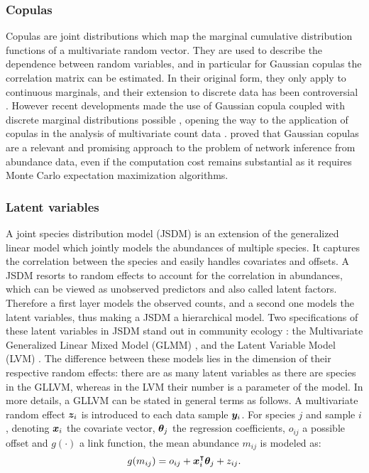 \subsubsection{Copulas}
Copulas are  joint  distributions which map the marginal  cumulative distribution functions of a multivariate random vector.  They are used to describe the dependence between random variables, and in particular for Gaussian copulas the correlation matrix can be estimated. In their original form, they only apply to continuous marginals, and their extension to discrete data has been controversial \citep{F17}. However recent developments made the use of  Gaussian copula coupled with discrete marginal distributions possible \citep{PCJ12,PHW18}, opening the way to the application of copulas in the analysis of multivariate count data \citep{AVP19}. \citet{PWT19} proved that  Gaussian copulas are a relevant and promising approach to the problem of network inference from abundance data, even if the computation cost remains substantial as it requires  Monte Carlo expectation maximization algorithms.

\subsubsection{Latent variables}
A joint species distribution model (JSDM) is an extension of the generalized linear model which jointly models  the abundances of multiple species. It captures  the correlation between the species and easily handles covariates and offsets. A JSDM resorts to random effects to account for the correlation in abundances, which can be viewed as unobserved predictors and also called latent factors. Therefore a first layer models the observed counts, and a second one models the latent variables, thus making a JSDM a hierarchical model. Two specifications of these latent variables in JSDM stand out in community ecology \citep{WBO15}:  the Multivariate Generalized Linear Mixed Model (GLMM) \citep{OHS10, PTM14}, and the Latent Variable Model (LVM)  \citep{OAP16}. The difference between these models lies in the dimension of their respective random effects: there are as many latent variables as there are species in the GLLVM, whereas in the LVM their number is a parameter of the model. In more details, a GLLVM can be stated in  general terms as follows. A multivariate random effect ${\boldsymbol{z}}_i$ is introduced to each data sample ${\boldsymbol{y}}_i$.  For species $j$ and sample $i$, denoting ${\boldsymbol{x}}_i$ the covariate vector, ${\boldsymbol{\theta}}_j$ the  regression coefficients, $o_{ij}$ a possible offset  and $g(\cdot)$ a link function, the mean abundance $m_{ij}$  is modeled as:
$$g(m_{ij}) = o_{ij}+{\boldsymbol{x}}_i^\intercal  {\boldsymbol{\theta}}_j + z_{ij}.$$
 

